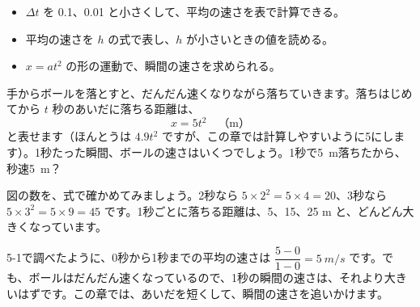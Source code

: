 
\begin{goal}
\begin{itemize}[label={\color{bkTheme}●}, leftmargin=1.6\zw, itemsep=0pt, topsep=1pt]
\item {}\enspace $\Delta t$ を 0.1、0.01 と小さくして、平均の速さを表で計算できる。
\item {}\enspace 平均の速さを $h$ の式で表し、$h$ が小さいときの値を読める。
\item {}\enspace $x=at^2$ の形の運動で、瞬間の速さを求められる。
\end{itemize}
\end{goal}

\begin{hatena}
\noindent\begin{minipage}[c]{0.71\linewidth}
手からボールを落とすと、だんだん速くなりながら落ちていきます。落ちはじめてから $t$ 秒のあいだに落ちる距離は、
\[ x=5t^2\quad\text{（m）} \]
と表せます（ほんとうは $4.9t^2$ ですが、この章では計算しやすいように5にします）。1秒たった瞬間、ボールの速さはいくつでしょう。1秒で\qty{5}{m}落ちたから、秒速\qty{5}{m}？
\end{minipage}\hfill
\begin{minipage}[c]{0.26\linewidth}\raggedleft
{}
\end{minipage}
\end{hatena}

図の数を、式で確かめてみましょう。2秒なら $5\times2^2=5\times4=20$、3秒なら $5\times3^2=5\times9=45$ です。1秒ごとに落ちる距離は、5、15、25 m と、どんどん大きくなっています。

5-1で調べたように、0秒から1秒までの平均の速さは $\dfrac{5-0}{1-0}=\qty{5}{m/s}$ です。でも、ボールはだんだん速くなっているので、1秒の瞬間の速さは、それより大きいはずです。この章では、あいだを短くして、瞬間の速さを追いかけます。

